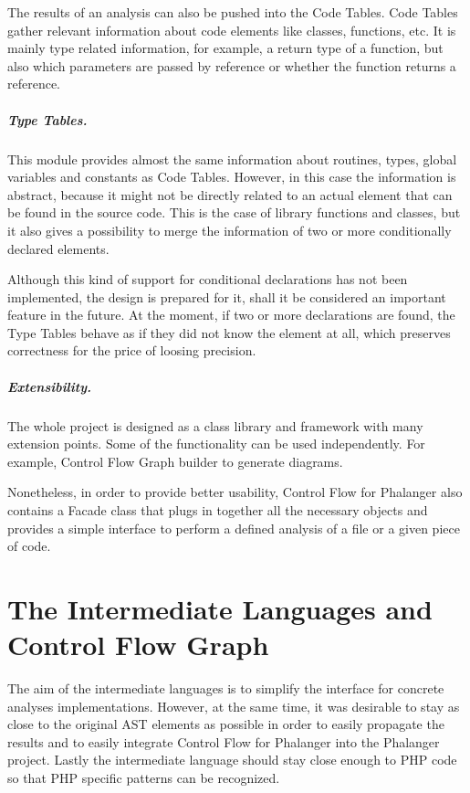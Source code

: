     The results of an analysis can also be pushed into 
    the Code Tables. Code Tables gather relevant information 
    about code elements like classes, functions, etc. 
    It is mainly type related information, 
    for example, a return type of a function, 
    but also which parameters are passed by reference or 
    whether the function returns a reference.
    
    \subparagraph*{Type Tables.} This module provides 
    almost the same information about routines, types, 
    global variables and constants as Code Tables. 
    However, in this case the information 
    is abstract, because it might not be directly related 
    to an actual element that can be found in the source code. 
    This is the case of library functions and classes, 
    but it also gives a possibility to merge the information 
    of two or more conditionally declared elements. 
    
    Although this kind of support for conditional declarations 
    has not been implemented, the design is prepared for it, 
    shall it be considered an important feature in the future. 
    At the moment, if two or more declarations are found, 
    the Type Tables behave as if they did not know the 
    element at all, which preserves correctness for the 
    price of loosing precision.
    
    \subparagraph*{Extensibility.}
    The whole project is designed as a class library and 
    framework with many extension points. Some of the 
    functionality can be used independently. For example, 
    Control Flow Graph builder to generate diagrams.
    
    Nonetheless, in order to provide better usability, 
    Control Flow for Phalanger also contains 
    a Facade class  
    that plugs in together all the necessary objects 
    and provides a simple interface to perform a defined 
    analysis of a file or a given piece of code.
    
    \section{The Intermediate Languages and Control Flow Graph}
        The aim of the intermediate languages is to simplify the 
        interface for concrete analyses implementations. 
        However, at the same time, it was desirable to stay as 
        close to the original AST elements as possible in order 
        to easily propagate the results and to easily integrate 
        Control Flow for Phalanger into the Phalanger project.         
        Lastly the intermediate language should stay close enough 
        to PHP code so that PHP specific patterns can be recognized.
        
